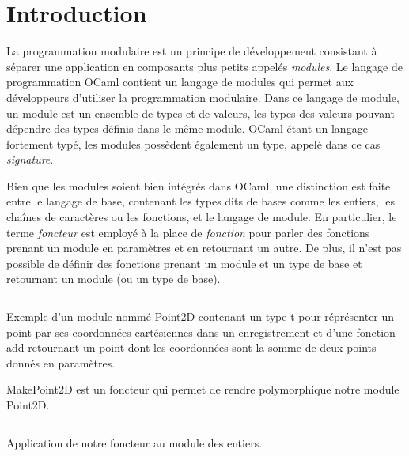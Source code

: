 \chapter*{Introduction}

La programmation modulaire est un principe de développement consistant à séparer une
application en composants plus petits appelés \textit{modules}. Le langage de
programmation OCaml contient un langage de modules qui permet aux développeurs
d'utiliser la programmation modulaire. Dans ce langage de module, un module est
un ensemble de types et de valeurs, les types des valeurs pouvant dépendre des
types définis dans le même module.
OCaml étant un langage fortement typé, les modules possèdent également
un type, appelé dans ce cas \textit{signature}.


Bien que les modules soient bien intégrés dans OCaml, une
distinction est faite entre le langage de base, contenant les types dits \og de
bases \fg comme les entiers, les chaînes de caractères ou les fonctions, et le
langage de module. En particulier, le terme \textit{foncteur} est employé à la
place de \textit{fonction} pour parler des fonctions prenant un module en
paramètres et en retournant un autre. De plus, il n'est pas possible de définir
des fonctions prenant un module et un type de base et retournant un module (ou un
type de base).

\renewcommand\listingscaption{Code OCaml}

\begin{listing}
  \inputminted{OCaml}{codes/intro_point2D.ml}
  \caption{Exemple d'un module nommé Point2D contenant un type t pour
    réprésenter un point par ses coordonnées cartésiennes dans un enregistrement
    et d'une fonction add retournant un point dont les coordonnées sont
    la somme de deux points donnés en paramètres.}
\end{listing}

\begin{listing}
  \caption{MakePoint2D est un foncteur qui permet de rendre polymorphique notre
    module Point2D.}
  \inputminted{OCaml}{codes/intro_point2D_polymorphic.ml}
\end{listing}

\begin{listing}
  \caption{Application de notre foncteur au module des entiers.}
  \inputminted{OCaml}{codes/intro_point2D_polymorphic_app.ml}
\end{listing}


